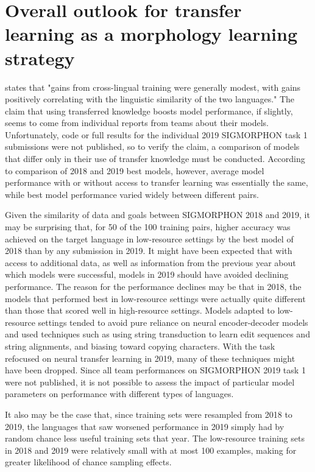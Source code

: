 \section{Overall outlook for transfer learning as a morphology learning strategy}

\cite{McCarthy2019} states that "gains from cross-lingual training were generally modest, with gains positively correlating with the linguistic similarity of the two languages." The claim that using transferred knowledge boosts model performance, if slightly, seems to come from individual reports from teams about their models. Unfortunately, code or full results for the individual 2019 SIGMORPHON task 1 submissions were not published, so to verify the claim, a comparison of models that differ only in their use of transfer knowledge must be conducted. According to comparison of 2018 and 2019 best models, however, average model performance with or without access to transfer learning was essentially the same, while best model performance varied widely between different pairs.

Given the similarity of data and goals between SIGMORPHON 2018 and 2019, it may be surprising that, for 50 of the 100 training pairs, higher accuracy was achieved on the target language in low-resource settings by the best model of 2018 than by any submission in 2019. It might have been expected that with access to additional data, as well as information from the previous year about which models were successful, models in 2019 should have avoided declining performance. The reason for the performance declines may be that in 2018, the models that performed best in low-resource settings were actually quite different than those that scored well in high-resource settings. Models adapted to low-resource settings tended to avoid pure reliance on neural encoder-decoder models and used techniques such as using string transduction to learn edit sequences and string alignments, and biasing toward copying characters. With the task refocused on neural transfer learning in 2019, many of these techniques might have been dropped. Since all team performances on SIGMORPHON 2019 task 1 were not published, it is not possible to assess the impact of particular model parameters on performance with different types of languages. 

It also may be the case that, since training sets were resampled from 2018 to 2019, the languages that saw worsened performance in 2019 simply had by random chance less useful training sets that year. The low-resource training sets in 2018 and 2019 were relatively small with at most 100 examples, making for greater likelihood of chance sampling effects.

